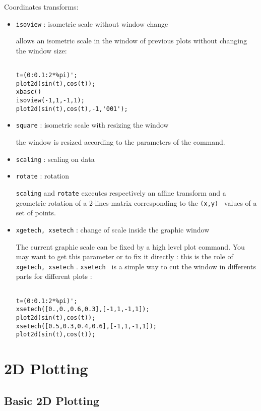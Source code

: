 Coordinates transforms:
\begin{itemize}
	\item \verb+isoview+	: isometric scale without window change 

allows an isometric scale in the window of previous plots without changing
the window size:

\begin{verbatim}

t=(0:0.1:2*%pi)';
plot2d(sin(t),cos(t));
xbasc()
isoview(-1,1,-1,1);
plot2d(sin(t),cos(t),-1,'001');

\end{verbatim}

	\item \verb+square+	: isometric scale with resizing the window

the window is resized according to the parameters of the command.

        \item \verb+scaling+	: scaling on data
        \item \verb+rotate+	: rotation

\verb+scaling+ and \verb+rotate+ executes respectively an affine transform and
a geometric rotation of a 2-lines-matrix corresponding to the {\tt (x,y) }
values of a set of points.
 
        \item \verb+xgetech, xsetech+	: change of scale inside the graphic window

The current graphic scale can be fixed by a high level plot command. You may
want to get this parameter or to fix it directly : this is the role of 
\verb+xgetech, xsetech+ . {\tt xsetech } is a simple way to cut the
window in differents parts for different plots :

\begin{verbatim}

t=(0:0.1:2*%pi)';
xsetech([0.,0.,0.6,0.3],[-1,1,-1,1]);
plot2d(sin(t),cos(t));
xsetech([0.5,0.3,0.4,0.6],[-1,1,-1,1]);
plot2d(sin(t),cos(t));

\end{verbatim}

\end{itemize}
%


\section{2D Plotting}

\subsection{Basic 2D Plotting}

